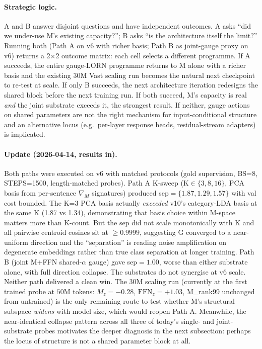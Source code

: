 \documentclass[11pt, a4paper]{article}
\theoremstyle{plain}
\theoremstyle{definition}
\theoremstyle{remark}
\begin{document}
\paragraph{Strategic logic.}
A and B answer disjoint questions and have independent outcomes.
A asks ``did we under-use M's existing capacity?''; B asks ``is the architecture itself the limit?''
Running both (Path A on v6 with richer basis; Path B as joint-gauge proxy on v6) returns a 2$\times$2 outcome matrix: each cell selects a different programme.
If A succeeds, the entire gauge-LORN programme returns to M alone with a richer basis and the existing 30M Vast scaling run becomes the natural next checkpoint to re-test at scale.
If only B succeeds, the next architecture iteration redesigns the shared block before the next training run.
If both succeed, M's capacity is real \emph{and} the joint substrate exceeds it, the strongest result.
If neither, gauge actions on shared parameters are not the right mechanism for input-conditional structure and an alternative locus (e.g.\ per-layer response heads, residual-stream adapters) is implicated.

\paragraph{Update (2026-04-14, results in).}
Both paths were executed on v6 with matched protocols (gold supervision, BS=8, STEPS=1500, length-matched probes).
Path A K-sweep (K$\in\{3,8,16\}$, PCA basis from per-sentence $\nabla_M$ signatures) produced sep$=\{1.87, 1.29, 1.57\}$ with val cost bounded.
The K=3 PCA basis actually \emph{exceeded} v10's category-LDA basis at the same K (1.87 vs 1.34), demonstrating that basis choice within M-space matters more than K-count.
But the sep did not scale monotonically with K and all pairwise centroid cosines sit at $\geq 0.9999$, suggesting G converged to a near-uniform direction and the ``separation'' is reading noise amplification on degenerate embeddings rather than true class separation at longer training.
Path B (joint M+FFN shared-$\alpha$ gauge) gave sep$=1.00$, worse than either substrate alone, with full direction collapse.
The substrates do not synergise at v6 scale.
Neither path delivered a clean win.
The 30M scaling run (currently at the first trained probe at $50$M tokens: $M_z = -0.28$, $\mathrm{FFN}_z = +1.03$, M\_rank99 unchanged from untrained) is the only remaining route to test whether M's structural subspace \emph{widens} with model size, which would reopen Path A.
Meanwhile, the near-identical collapse pattern across all three of today's single- and joint-substrate probes motivates the deeper diagnosis in the next subsection: perhaps the locus of structure is not a shared parameter block at all.
\end{document}
